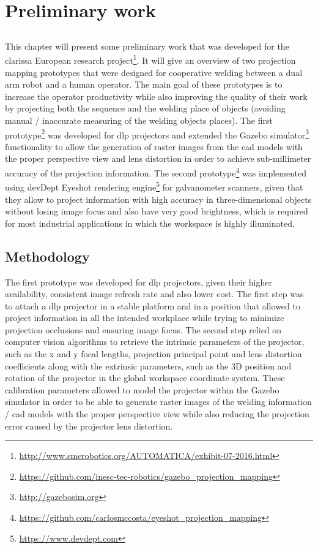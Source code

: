 \chapter{Preliminary work}\label{chap:preliminary-work}

\section*{}

This chapter will present some preliminary work that was developed for the \gls{clarissa} European research project\footnote{\url{http://www.smerobotics.org/AUTOMATICA/exhibit-07-2016.html}}. It will give an overview of two projection mapping prototypes that were designed for cooperative welding between a dual arm robot and a human operator. The main goal of these prototypes is to increase the operator productivity while also improving the quality of their work by projecting both the sequence and the welding place of objects (avoiding manual / inaccurate measuring of the welding objects places). The first prototype\footnote{\url{https://github.com/inesc-tec-robotics/gazebo_projection_mapping}} was developed for \gls{dlp} projectors and extended the Gazebo simulator\footnote{\url{http://gazebosim.org}} functionality to allow the generation of raster images from the \gls{cad} models with the proper perspective view and lens distortion in order to achieve sub-millimeter accuracy of the projection information. The second prototype\footnote{\url{https://github.com/carlosmccosta/eyeshot_projection_mapping}} was implemented using devDept Eyeshot rendering engine\footnote{\url{https://www.devdept.com}} for galvanometer scanners, given that they allow to project information with high accuracy in three-dimensional objects without losing image focus and also have very good brightness, which is required for most industrial applications in which the workspace is highly illuminated.


\section{Methodology}

The first prototype was developed for \gls{dlp} projectors, given their higher availability, consistent image refresh rate and also lower cost. The first step was to attach a \gls{dlp} projector in a stable platform and in a position that allowed to project information in all the intended workplace while trying to minimize projection occlusions and ensuring image focus. The second step relied on computer vision algorithms to retrieve the intrinsic parameters of the projector, such as the x and y focal lengths, projection principal point and lens distortion coefficients along with the extrinsic parameters, such as the 3D position and rotation of the projector in the global workspace coordinate system. These calibration parameters allowed to model the projector within the Gazebo simulator in order to be able to generate raster images of the welding information / \gls{cad} models with the proper perspective view while also reducing the projection error caused by the projector lens distortion.

